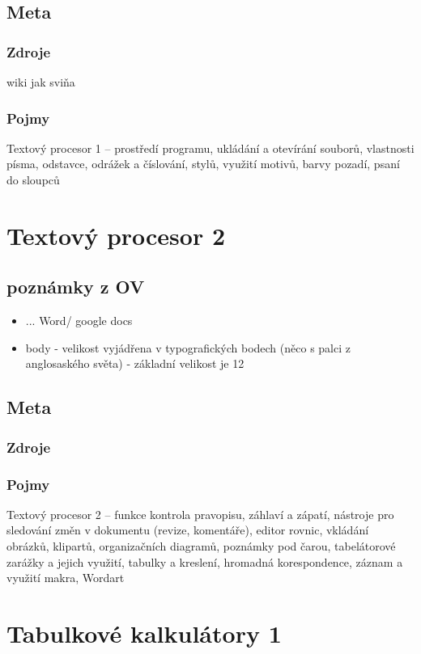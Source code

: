 \documentclass[12pt]{article}
\begin{document}
\subsection{Meta}
\subsubsection{Zdroje}
wiki jak sviňa
\subsubsection{Pojmy}
Textový procesor 1 – prostředí programu, ukládání a otevírání souborů, vlastnosti písma, odstavce, odrážek a číslování, stylů, využití motivů, barvy pozadí, psaní do sloupců

\section{Textový procesor 2}
\subsection{poznámky z OV}
\begin{itemize}
\item ... Word/ google docs
\item body - velikost vyjádřena v typografických bodech (něco s palci z anglosaského světa) - základní velikost je 12 
\end{itemize}

\subsection{Meta}
\subsubsection{Zdroje}
\subsubsection{Pojmy}
Textový procesor 2 – funkce kontrola pravopisu, záhlaví a zápatí, nástroje pro sledování změn v dokumentu (revize, komentáře), editor rovnic, vkládání obrázků, klipartů, organizačních diagramů, poznámky pod čarou, tabelátorové zarážky a jejich využití, tabulky a kreslení, hromadná korespondence, záznam a využití makra, Wordart

\section{Tabulkové kalkulátory 1}
\end{document}
